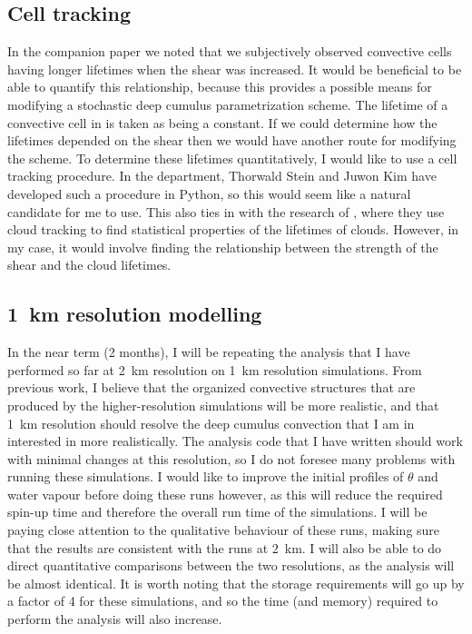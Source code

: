 \documentclass[11pt,a4paper]{article}
\begin{document}
\subsection{Cell tracking}
\label{sec:cell_tracking}

In the companion paper we noted that we subjectively observed convective cells having longer lifetimes when the shear was increased. It would be beneficial to be able to quantify this relationship, because this provides a possible means for modifying a stochastic deep cumulus parametrization scheme. The lifetime of a convective cell in \cite{plant2008stochastic} is taken as being a constant. If we could determine how the lifetimes depended on the shear then we would have another route for modifying the scheme. To determine these lifetimes quantitatively, I would like to use a cell tracking procedure. In the department, Thorwald Stein and Juwon Kim have developed such a procedure in Python, so this would seem like a natural candidate for me to use. This also ties in with the research of \cite{plant2009statistical}, where they use cloud tracking to find statistical properties of the lifetimes of clouds. However, in my case, it would involve finding the relationship between the strength of the shear and the cloud lifetimes.

\subsection{\SI{1}{km} resolution modelling}
\label{sec:1km_res}

In the near term (2 months), I will be repeating the analysis that I have performed so far at \SI{2}{km} resolution on \SI{1}{km} resolution simulations. From previous work, I believe that the organized convective structures that are produced by the higher-resolution simulations will be more realistic, and that \SI{1}{km} resolution should resolve the deep cumulus convection that I am in interested in more realistically. The analysis code that I have written should work with minimal changes at this resolution, so I do not foresee many problems with running these simulations. I would like to improve the initial profiles of $\theta$ and water vapour before doing these runs however, as this will reduce the required spin-up time and therefore the overall run time of the simulations. I will be paying close attention to the qualitative behaviour of these runs, making sure that the results are consistent with the runs at \SI{2}{km}. I will also be able to do direct quantitative comparisons between the two resolutions, as the analysis will be almost identical. It is worth noting that the storage requirements will go up by a factor of 4 for these simulations, and so the time (and memory) required to perform the analysis will also increase.
\end{document}
